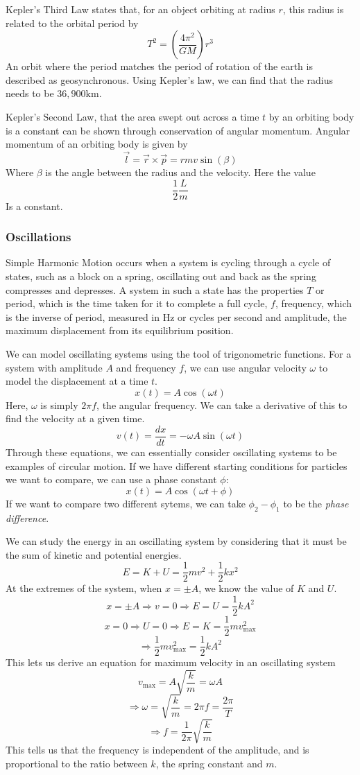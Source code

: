 \documentclass[12pt]{report}
\begin{document}
\begin{flushleft}
\bigskip
Kepler's Third Law states that, for an object orbiting at radius \(r\), this
radius is related to the orbital period by
\[T^2 = \left(\frac{4\pi^2}{GM}\right)r^3\]
An orbit where the period matches the period of rotation of the earth is 
described as geosynchronous. Using Kepler's law, we can find that the
radius needs to be \(36,900\mathrm{km}\).

\bigskip
Kepler's Second Law, that the area swept out across a time \(t\) by an orbiting
body is a constant can be shown through conservation of angular momentum. 
Angular momentum of an orbiting body is given by
\[\vec{l} = \vec{r}\times\vec{p} = rmv\sin(\beta)\]
Where \(\beta\) is the angle between the radius and the velocity. Here the 
value
\[\frac{1}{2}\frac{L}{m}\]
Is a constant.

\subsubsection*{Oscillations}
Simple Harmonic Motion occurs when a system is cycling through a cycle of 
states, such as a block on a spring, oscillating out and back as the spring
compresses and depresses. A system in such a state has the properties \(T\) or
period, which is the time taken for it to complete a full cycle, \(f\), 
frequency, which is the inverse of period, measured in \(\mathrm{Hz}\) or 
cycles per second and amplitude, the maximum displacement from its equilibrium
position.

\bigskip
We can model oscillating systems using the tool of trigonometric functions.
For a system with amplitude \(A\) and frequency \(f\), we can use angular
velocity \(\omega\) to model the displacement at a time \(t\).
\[x(t) = A\cos(\omega t)\]
Here, \(\omega\) is simply \(2\pi f\), the angular frequency. We can take a
derivative of this to find the velocity at a given time.
\[v(t) = \frac{dx}{dt} = -\omega A\sin(\omega t)\]
Through these equations, we can essentially consider oscillating systems to
be examples of circular motion. If we have different starting conditions for
particles we want to compare, we can use a phase constant \(\phi\):
\[x(t) = A\cos(\omega t + \phi)\]
If we want to compare two different sytems, we can take \(\phi_2 - \phi_1\) to
be the \textit{phase difference}.

\bigskip
We can study the energy in an oscillating system by considering that it must
be the sum of kinetic and potential energies.
\[E = K + U = \frac{1}{2}mv^2 + \frac{1}{2}kx^2\]
At the extremes of the system, when \(x = \pm A\), we know the value of \(K\)
and \(U\).
\[x = \pm A \Rightarrow v = 0 \Rightarrow E = U = \frac{1}{2}kA^2\]
\[x = 0 \Rightarrow U = 0 \Rightarrow E = K = \frac{1}{2}mv^2_\mathrm{max}\]
\[\Rightarrow \frac{1}{2}mv^2_\mathrm{max} = \frac{1}{2}kA^2\]
This lets us derive an equation for maximum velocity in an oscillating system
\[v_\mathrm{max} = A\sqrt{\frac{k}{m}} = \omega A \]
\[\Rightarrow \omega = \sqrt{\frac{k}{m}} = 2\pi f = \frac{2\pi}{T}\]
\[\Rightarrow f = \frac{1}{2\pi}\sqrt{\frac{k}{m}}\]
This tells us that the frequency is independent of the amplitude, and is 
proportional to the ratio between \(k\), the spring constant and \(m\).


\end{flushleft}
\end{document}
